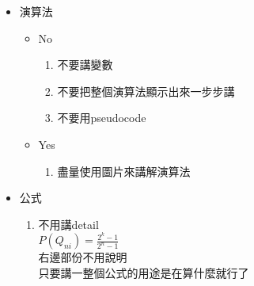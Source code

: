 \begin{enumerate}
{\begin{itemize}
{\begin{enumerate}
          \item
          {
            在1x分鐘中的報告是不用講, 除非如果不講相關的研究, 接下去觀眾就會完全不懂, 這才需要去提到 (因為是非常相關)
          } %
        \end{enumerate}
      } %

      \item
      {
        演算法
        \begin{itemize}
          \item
          {
            No
            \begin{enumerate}
              \item
              {
                不要講變數
              } %

              \item
              {
                不要把整個演算法顯示出來一步步講
              } %

              \item
              {
                不要用pseudocode
              } %
            \end{enumerate}
          } %

          \item
          {
            Yes
            \begin{enumerate}
              \item
              {
                盡量使用圖片來講解演算法
              } %
            \end{enumerate}
          } %
        \end{itemize}
      } %

      \item
      {
        公式
        \begin{enumerate}
          \item
          {
            不用講detail\\
            $ P( Q_{ni} ) = \frac{ 2^{k} - 1}{ 2^{n} - 1} $\\
            右邊部份不用說明\\
            只要講一整個公式的用途是在算什麼就行了
          } %


\end{enumerate}}
\end{itemize}}
\end{enumerate}
